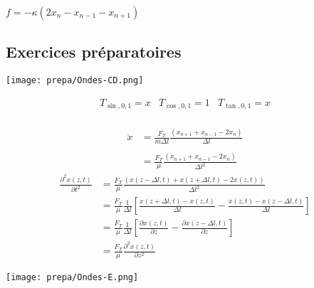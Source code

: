 \documentclass[british,french,11pt, a4paper, openany]{book}
\begin{document}
			$f=-\kappa(2x_n-x_{n-1}-x_{n+1})$
			
			
			
			\subsection{Exercices préparatoires}
				
			\begin{center}
			\texttt{[image: prepa/Ondes-CD.png]}\\
			\end{center}
			
			$$\begin{array}{lcr} T_{\sin,0,1}=x & T_{\cos,0,1}=1 & T_{\tan,0,1}=x\end{array}$$ \\
			\begin{align*}
			\ddot{x} & =\frac{F_T}{m\Delta l}\frac{(x_{n+1}+x_{n-1}-2x_n)}{\Delta l}\\\\
			& =\frac{F_T}{\mu}\frac{(x_{n+1}+x_{n-1}-2x_n)}{\Delta l^2}\end{align*}
			\begin{align*}
			\frac{\partial^2 x(z,t)}{\partial t^2} & =\frac{F_T}{\mu}\frac{(x(z-\Delta l,t)+x(z+\Delta l, t)-2x(z,t))}{\Delta l^2}\\
			& =\frac{F_T}{\mu}\frac{1}{\Delta l}\left[\frac{x(z+\Delta l,t)-x(z,t)}{\Delta l}-\frac{x(z,t)-x(z-\Delta l,t)}{\Delta l}\right]\\
			& =\frac{F_T}{\mu}\frac{1}{\Delta l}\left[\frac{\partial x(z,t)}{\partial z}-\frac{\partial x(z-\Delta l,t)}{\partial z}\right]\\
			& =\frac{F_T}{\mu}\frac{\partial^2x(z,t)}{\partial z^2}
		\end{align*}
		
		\begin{center}
			\texttt{[image: prepa/Ondes-E.png]}\\
		\end{center}
		
\end{document}
